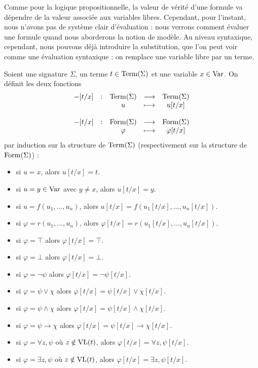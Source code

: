 Comme pour la logique propositionnelle, la valeur de vérité d'une formule va
dépendre de la valeur associée aux variables libres. Cependant, pour l'instant,
nous n'avons pas de système clair d'évaluation : nous verrons comment évaluer
une formule quand nous aborderons la notion de modèle. Au niveau syntaxique,
cependant, nous pouvons déjà introduire la substitution, que l'on peut voir
comme une évaluation syntaxique : on remplace une variable libre par un terme.

\begin{definition}[Substitution]
  Soient une signature $\Sigma$, un terme $t\in \operatorname{Term}(\Sigma)$ et une variable
  $x\in \operatorname{Var}$. On définit les deux fonctions
  \[\begin{array}{rcccc}
  -[t/x] &: & \operatorname{Term}(\Sigma) & \longrightarrow & \operatorname{Term}(\Sigma)\\
  & & u & \longmapsto & u[t/x] \\
  \\
  -[t/x] &: & \operatorname{Form}(\Sigma) & \longrightarrow & \operatorname{Form}(\Sigma)\\
  & & \varphi & \longmapsto & \varphi[t/x]
  \end{array}\]
  par induction sur la structure de $\operatorname{Term}(\Sigma)$ (respectivement sur la
  structure de $\operatorname{Form}(\Sigma)$) :
  \begin{itemize}
  \item si $u = x$, alors $u[t/x] = t$.
  \item si $u = y\in \operatorname{Var}$ avec $y \neq x$, alors $u[t/x] = y$.
  \item si $u = f(u_1,\ldots,u_n)$, alors
    $u[t/x] = f(u_1[t/x],\ldots,u_n[t/x])$.
  \item si $\varphi = r(u_1,\ldots,u_n)$, alors
    $\varphi[t/x] = r(u_1[t/x],\ldots,u_n[t/x])$.
  \item si $\varphi = \top$ alors $\varphi[t/x] = \top$.
  \item si $\varphi = \bot$ alors $\varphi[t/x] = \bot$.
  \item si $\varphi = \lnot \psi$ alors $\varphi[t/x] = \lnot \psi[t/x]$.
  \item si $\varphi = \psi \lor \chi$ alors
    $\varphi[t/x] = \psi[t/x]\lor\chi[t/x]$.
  \item si $\varphi = \psi \land \chi$ alors
    $\varphi[t/x] = \psi[t/x]\land\chi[t/x]$.
  \item si $\varphi = \psi \to \chi$ alors
    $\varphi[t/x] = \psi[t/x]\to\chi[t/x]$.
  \item si $\varphi = \forall z, \psi$ où $z\notin \operatorname{VL}(t)$, alors
    $\varphi[t/x] = \forall z, \psi[t/x]$.
  \item si $\varphi = \exists z, \psi$ où $z\notin \operatorname{VL}(t)$, alors
    $\varphi[t/x] = \exists z, \psi[t/x]$.
  \end{itemize}
\end{definition}

